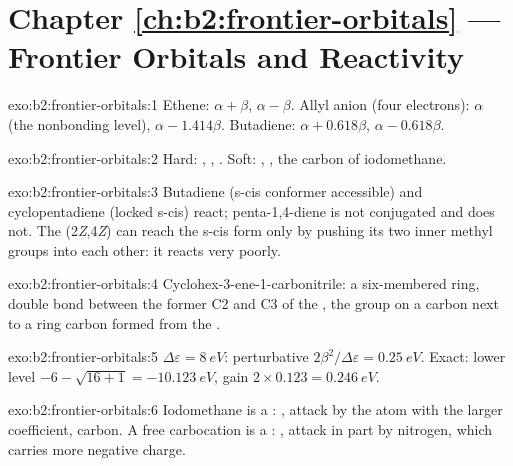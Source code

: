 \section*{Chapter \ref{ch:b2:frontier-orbitals} --- Frontier Orbitals and Reactivity}

\begin{solution}{exo:b2:frontier-orbitals:1}
Ethene:  $\alpha + \beta$,  $\alpha - \beta$. Allyl anion (four electrons):  $\alpha$ (the
nonbonding level),  $\alpha - 1.414\beta$. Butadiene:  $\alpha + 0.618\beta$,  $\alpha -
0.618\beta$.
\end{solution}

\begin{solution}{exo:b2:frontier-orbitals:2}
Hard: , , . Soft: , , the carbon of iodomethane.
\end{solution}

\begin{solution}{exo:b2:frontier-orbitals:3}
Butadiene (s-cis conformer accessible) and cyclopentadiene (locked s-cis) react;
penta-1,4-diene is not conjugated and does not. The (2\textit{Z},4\textit{Z})  can
reach the s-cis form only by pushing its two inner methyl groups into each other: it
reacts very poorly.
\end{solution}

\begin{solution}{exo:b2:frontier-orbitals:4}
Cyclohex-3-ene-1-carbonitrile: a six-membered ring, double bond between the former C2
and C3 of the , the  group on a carbon next to a ring carbon formed from the
.
\end{solution}

\begin{solution}{exo:b2:frontier-orbitals:5}
$\Delta\varepsilon = \qty{8}{eV}$: perturbative $2\beta^2/\Delta\varepsilon = \qty{0.25}{eV}$. Exact: lower level
$-6 - \sqrt{16 + 1} = \qty{-10.123}{eV}$, gain $2 \times 0.123 = \qty{0.246}{eV}$.
\end{solution}

\begin{solution}{exo:b2:frontier-orbitals:6}
Iodomethane is a : , attack by the atom with the larger
 coefficient, carbon. A free carbocation is a : ,
attack in part by nitrogen, which carries more negative charge.
\end{solution}

